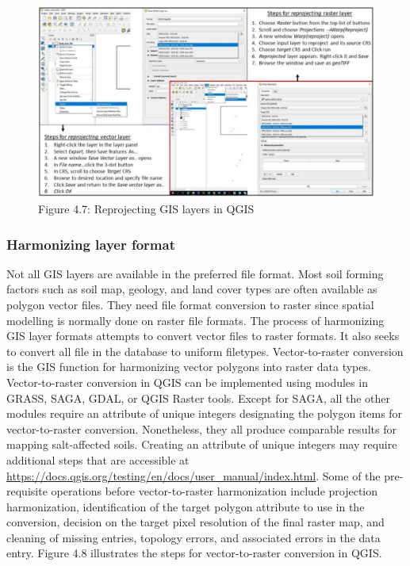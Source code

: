 \documentclass[
  10pt,
  b5paper,
]{book}
\begin{document}
\begin{figure}
\centering
\includegraphics{figures/images/Figure4.7.PNG}
\caption{Figure 4.7: Reprojecting GIS layers in QGIS}
\end{figure}

\hypertarget{harmonizing-layer-format}{%
\subsubsection{Harmonizing layer format}\label{harmonizing-layer-format}}

Not all GIS layers are available in the preferred file format. Most soil forming factors such as soil map, geology, and land cover types are often available as polygon vector files. They need file format conversion to raster since spatial modelling is normally done on raster file formats. The process of harmonizing GIS layer formats attempts to convert vector files to raster formats. It also seeks to convert all file in the database to uniform filetypes. Vector-to-raster conversion is the GIS function for harmonizing vector polygons into raster data types.
Vector-to-raster conversion in QGIS can be implemented using modules in GRASS, SAGA, GDAL, or QGIS Raster tools. Except for SAGA, all the other modules require an attribute of unique integers designating the polygon items for vector-to-raster conversion. Nonetheless, they all produce comparable results for mapping salt-affected soils. Creating an attribute of unique integers may require additional steps that are accessible at \url{https://docs.qgis.org/testing/en/docs/user_manual/index.html}.
Some of the pre-requisite operations before vector-to-raster harmonization include projection harmonization, identification of the target polygon attribute to use in the conversion, decision on the target pixel resolution of the final raster map, and cleaning of missing entries, topology errors, and associated errors in the data entry. Figure 4.8 illustrates the steps for vector-to-raster conversion in QGIS.
\end{document}
